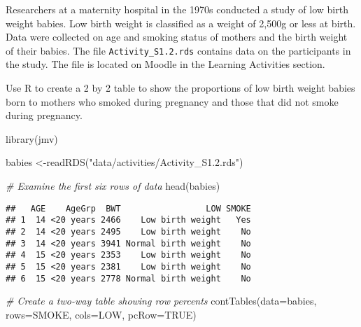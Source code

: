 \documentclass[
]{memoir}
\newenvironment{Shaded}{\begin{snugshade}}{\end{snugshade}}
\newcommand{\AttributeTok}[1]{\textcolor[rgb]{0.77,0.63,0.00}{#1}}
\newcommand{\CommentTok}[1]{\textcolor[rgb]{0.56,0.35,0.01}{\textit{#1}}}
\newcommand{\ConstantTok}[1]{\textcolor[rgb]{0.00,0.00,0.00}{#1}}
\newcommand{\FunctionTok}[1]{\textcolor[rgb]{0.00,0.00,0.00}{#1}}
\newcommand{\NormalTok}[1]{#1}
\newcommand{\OtherTok}[1]{\textcolor[rgb]{0.56,0.35,0.01}{#1}}
\newcommand{\StringTok}[1]{\textcolor[rgb]{0.31,0.60,0.02}{#1}}
\begin{document}
Researchers at a maternity hospital in the 1970s conducted a study of low birth weight babies. Low birth weight is classified as a weight of 2,500g or less at birth. Data were collected on age and smoking status of mothers and the birth weight of their babies. The file \texttt{Activity\_S1.2.rds} contains data on the participants in the study. The file is located on Moodle in the Learning Activities section.

Use R to create a 2 by 2 table to show the proportions of low birth weight babies born to mothers who smoked during pregnancy and those that did not smoke during pregnancy.

\begin{Shaded}
\begin{Highlighting}[]
\FunctionTok{library}\NormalTok{(jmv)}

\NormalTok{babies }\OtherTok{\textless{}{-}}\FunctionTok{readRDS}\NormalTok{(}\StringTok{"data/activities/Activity\_S1.2.rds"}\NormalTok{)}

\CommentTok{\# Examine the first six rows of data}
\FunctionTok{head}\NormalTok{(babies)}
\end{Highlighting}
\end{Shaded}

\begin{verbatim}
##   AGE    AgeGrp  BWT                 LOW SMOKE
## 1  14 <20 years 2466    Low birth weight   Yes
## 2  14 <20 years 2495    Low birth weight    No
## 3  14 <20 years 3941 Normal birth weight    No
## 4  15 <20 years 2353    Low birth weight    No
## 5  15 <20 years 2381    Low birth weight    No
## 6  15 <20 years 2778 Normal birth weight    No
\end{verbatim}

\begin{Shaded}
\begin{Highlighting}[]
\CommentTok{\# Create a two{-}way table showing row percents}
\FunctionTok{contTables}\NormalTok{(}\AttributeTok{data=}\NormalTok{babies, }\AttributeTok{rows=}\NormalTok{SMOKE, }\AttributeTok{cols=}\NormalTok{LOW, }\AttributeTok{pcRow=}\ConstantTok{TRUE}\NormalTok{)}
\end{Highlighting}
\end{Shaded}
\end{document}
